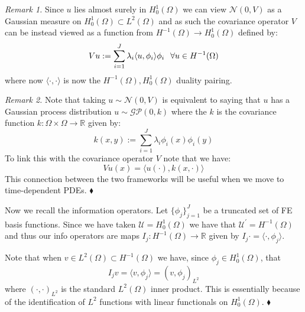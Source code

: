 \begin{remarks}
    \textit{Remark 1.} Since $u$ lies almost surely in $H_{0}^{1}(\Omega)$ we can view $\mathcal{N}(0,V)$ as a Gaussian measure on $H_{0}^{1}(\Omega)\subset L^{2}(\Omega)$ and as such the covariance operator $V$ can be instead viewed as a function from $H^{-1}(\Omega)\rightarrow H_{0}^{1}(\Omega)$ defined by:
    \begin{equation}
        Vu := \sum_{i=1}^{J}\lambda_{i}\langle u, \phi_{i}\rangle\phi_{i} \hspace{0.25cm} \forall u\in H^{-1}(\Omega)
    \end{equation}
    where now $\langle\boldsymbol{\cdot},\boldsymbol{\cdot}\rangle$ is now the $H^{-1}(\Omega),H_{0}^{1}(\Omega)$ duality pairing.

    \noindent \textit{Remark 2.} Note that taking $u\sim\mathcal{N}(0,V)$ is equivalent to saying that $u$ has a Gaussian process distribution $u\sim\mathcal{G}\mathcal{P}(0,k)$ where the $k$ is the covariance function $k:\Omega\times\Omega\rightarrow\mathbb{R}$ given by:
    \begin{equation}
        \label{cov_function_FEM_prior}
        k(x,y):=\sum_{i=1}^{J}\lambda_{i}\phi_{i}(x)\phi_{i}(y)
    \end{equation}
    To link this with the covariance operator $V$ note that we have:
    \begin{equation}
        Vu(x)=\langle u(\boldsymbol{\cdot}), k(x,\boldsymbol{\cdot})\rangle
    \end{equation}
    This connection between the two frameworks will be useful when we move to time-dependent PDEs.
    $\mathbin{\blacklozenge}$
\end{remarks}
Now we recall the information operators. Let $\{\phi_{j}\}_{j=1}^{J}$ be a truncated set of FE basis functions. Since we have taken $\mathcal{U}=H_{0}^{1}(\Omega)$ we have that $\mathcal{U}^{\prime}=H^{-1}(\Omega)$ and thus our info operators are maps $I_{j}:H^{-1}(\Omega)\rightarrow\mathbb{R}$ given by $I_{j}\boldsymbol{\cdot}=\langle\boldsymbol{\cdot},\phi_{j}\rangle$. \vspace{10pt}

\begin{remark}
    Note that when $v\in L^{2}(\Omega)\subset H^{-1}(\Omega)$ we have, since $\phi_{j}\in H^{1}_{0}(\Omega)$, that
    \begin{equation*}
        I_{j}v=\langle v,\phi_{j}\rangle=(v,\phi_{j})_{L^2}
    \end{equation*}
    where $(\boldsymbol{\cdot},\boldsymbol{\cdot})_{L^2}$ is the standard $L^2(\Omega)$ inner product. This is essentially because of the identification of $L^2$ functions with linear functionals on $H^{1}_{0}(\Omega)$.
    $\mathbin{\blacklozenge}$
\end{remark}

